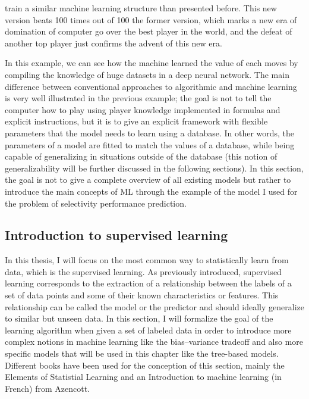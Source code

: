 \documentclass[main]{subfiles}
\begin{document}
train a similar machine learning structure than presented before. This new version beats 100 times out of 100 the former version,\autocite{Silver_2017} which marks a new era of domination of computer go over the best player in the world, and the defeat of another top player just confirms the advent of this new era. 

In this example, we can see how the machine learned the value of each moves by compiling the knowledge of huge datasets in a deep neural network. The main difference between conventional approaches to algorithmic and machine learning is very well illustrated in the previous example; the goal is not to tell the computer how to play using player knowledge implemented in formulas and explicit instructions, but it is to give an explicit framework with flexible parameters that the model needs to learn using a database. In other words, the parameters of a model are fitted to match the values of a database, while being capable of generalizing in situations outside of the database (this notion of generalizability will be further discussed in the following sections). In this section, the goal is not to give a complete overview of all existing models but rather to introduce the main concepts of ML through the example of the model I used for the problem of selectivity performance prediction.

\subsection{Introduction to supervised learning}

In this thesis, I will focus on the most common way to statistically learn from data, which is the supervised learning. As previously introduced, supervised learning corresponds to the extraction of a relationship between the labels of a set of data points and some of their known characteristics or features. This relationship can be called the model or the predictor and should ideally generalize to similar but unseen data. In this section, I will formalize the goal of the learning algorithm when given a set of labeled data in order to introduce more complex notions in machine learning like the bias--variance tradeoff and also more specific models that will be used in this chapter like the tree-based models. Different books have been used for the conception of this section, mainly the Elements of Statistial Learning\autocite{Hastie_2009} and an Introduction to machine learning (in French) from Azencott\autocite{azencott2022introduction}.
\end{document}
